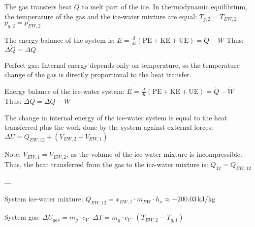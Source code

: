 The gas transfers heat \( Q \) to melt part of the ice. In thermodynamic equilibrium, the temperature of the gas and the ice-water mixture are equal:  
\( T_{g,2} = T_{EW,2} \)  
\( p_{g,2} = p_{EW,2} \)  

The energy balance of the system is:  
\( \dot{E} = \frac{d}{dt} (\text{PE} + \text{KE} + \text{UE}) = \dot{Q} - \dot{W} \)  
Thus:  
\( \Delta \dot{Q} = \Delta Q \)  

Perfect gas:  
Internal energy depends only on temperature, so the temperature change of the gas is directly proportional to the heat transfer.  

Energy balance of the ice-water system:  
\( \dot{E} = \frac{d}{dt} (\text{PE} + \text{KE} + \text{UE}) = \dot{Q} - \dot{W} \)  
Thus:  
\( \Delta \dot{Q} = \Delta Q - \dot{W} \)  

The change in internal energy of the ice-water system is equal to the heat transferred plus the work done by the system against external forces:  
\( \Delta U = Q_{EW,12} + (V_{EW,2} - V_{EW,1}) \)  

Note:  
\( V_{EW,1} = V_{EW,2} \), as the volume of the ice-water mixture is incompressible.  
Thus, the heat transferred from the gas to the ice-water mixture is:  
\( Q_{12} = Q_{EW,12} \)  

---

System ice-water mixture:  
\( Q_{EW,12} = x_{EW,1} \cdot m_{EW} \cdot h_{x} \approx -200.03 \, \text{kJ/kg} \)  

System gas:  
\( \Delta U_{gas} = m_g \cdot c_V \cdot \Delta T = m_g \cdot c_V \cdot (T_{EW,2} - T_{g,1}) \)